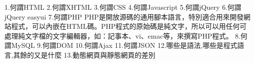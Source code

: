 1.何謂HTML
2.何謂XHTML
3.何謂CSS
4.何謂Javascript
5.何謂jQuery
6.何謂jQuery easyui
7.何謂PHP
PHP是開放源碼的通用腳本語言，特別適合用來開發網站程式，可以內嵌在HTML碼。PHP程式的原始碼是純文字，所以可以用任何可處理純文字檔的文字編輯器，如：記事本、vi、emac等，來撰寫PHP程式。
8.何謂MySQL
9.何謂DOM
10.何謂Ajax
11.何謂JSON
12.哪些是語法,哪些是程式語言,其餘的又是什麼
13.動態網頁與靜態網頁的差別

